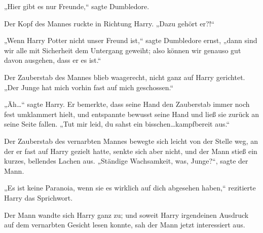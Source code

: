 „Hier gibt es nur Freunde,“ sagte Dumbledore.

Der Kopf des Mannes ruckte in Richtung Harry. „Dazu gehört er?!“

„Wenn Harry Potter nicht unser Freund ist,“ sagte Dumbledore ernst, „dann sind wir alle mit Sicherheit dem Untergang geweiht; also können wir genauso gut davon ausgehen, dass er es ist.“

Der Zauberstab des Mannes blieb waagerecht, nicht ganz auf Harry gerichtet. „Der Junge hat mich vorhin fast auf mich geschossen.“

„Äh…“ sagte Harry. Er bemerkte, dass seine Hand den Zauberstab immer noch fest umklammert hielt, und entspannte bewusst seine Hand und ließ sie zurück an seine Seite fallen. „Tut mir leid, du sahst ein bisschen…kampfbereit aus.“

Der Zauberstab des vernarbten Mannes bewegte sich leicht von der Stelle weg, an der er fast auf Harry gezielt hatte, senkte sich aber nicht, und der Mann stieß ein kurzes, bellendes Lachen aus. „Ständige Wachsamkeit, was, Junge?“, sagte der Mann.

„Es ist keine Paranoia, wenn sie es wirklich auf dich abgesehen haben,“ rezitierte Harry das Sprichwort.

Der Mann wandte sich Harry ganz zu; und soweit Harry irgendeinen Ausdruck auf dem vernarbten Gesicht lesen konnte, sah der Mann jetzt interessiert aus.


